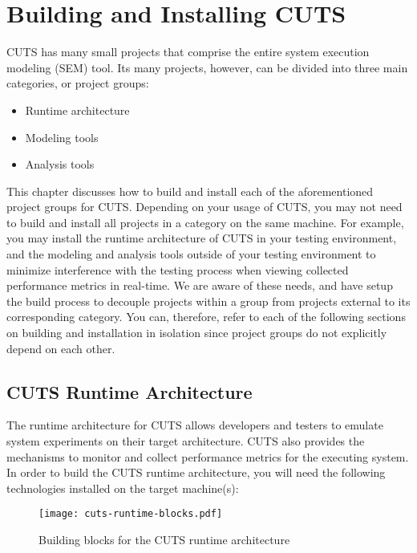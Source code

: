 
\chapter{Building and Installing CUTS}
\label{chap:install}

CUTS has many small projects that comprise the entire system execution modeling
(SEM) tool. Its many projects, however, can be divided into three main categories, or
project groups:

\begin{itemize}
  \item Runtime architecture
  \item Modeling tools
  \item Analysis tools
\end{itemize}

\noindent This chapter discusses how to build and install each of the aforementioned
project groups for CUTS. Depending on your usage of CUTS, you may not need to build 
and install all projects in a category on the same machine. For example, you may install the 
runtime architecture of CUTS in your testing environment, and the modeling and analysis
tools outside of your testing environment to minimize interference with the testing 
process when viewing collected performance metrics in real-time. We are aware of 
these needs, and have setup the build process to decouple projects within a group from 
projects external to its corresponding category. You can, therefore, refer to each of the 
following sections on building and installation in isolation since project groups do 
not explicitly depend on each other.

\section{CUTS Runtime Architecture}
\label{sec:install-runtime}

The runtime architecture for CUTS allows developers and testers to emulate system 
experiments on their target architecture. CUTS also provides the mechanisms
to monitor and collect performance metrics for the executing system. In order to 
build the CUTS runtime architecture, you will need the following technologies 
installed on the target machine(s):

\begin{figure}[htbp]
  \centering
  \texttt{[image: cuts-runtime-blocks.pdf]}
  \caption{Building blocks for the CUTS runtime architecture}
  \label{fig:cuts-runtime-blocks}
\end{figure}

